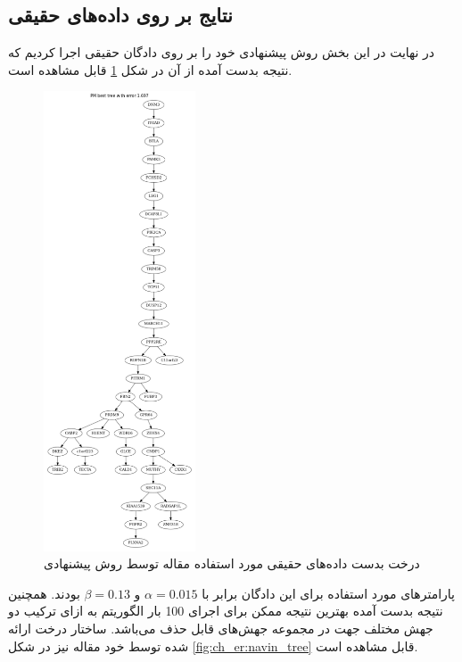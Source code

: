 \subsection{نتایج بر روی داده‌های حقیقی}
در نهایت در این بخش روش پیشنهادی خود را بر روی دادگان حقیقی \cite{davis2016computing} اجرا کردیم که نتیجه بدست آمده از آن در شکل \ref{fig:ch_er:pm_tree} قابل مشاهده است.

\begin{figure}[!ht]
	\centering
	\includegraphics[width=0.4\textwidth]{img/chaps/er/pm2}
	\caption{درخت بدست داده‌های حقیقی مورد استفاده مقاله \cite{davis2016computing} توسط روش پیشنهادی}
	\label{fig:ch_er:pm_tree}
\end{figure}
\noindent
پارامترهای مورد استفاده برای این دادگان برابر با $\alpha=0.015$ و $\beta=0.13$ بودند. همچنین نتیجه بدست آمده بهترین نتیجه ممکن برای اجرای 100 بار الگوریتم به ازای ترکیب دو جهش مختلف جهت در مجموعه جهش‌های قابل حذف می‌باشد. ساختار درخت ارائه شده توسط خود مقاله نیز در شکل \ref{fig:ch_er:navin_tree} قابل مشاهده است.

